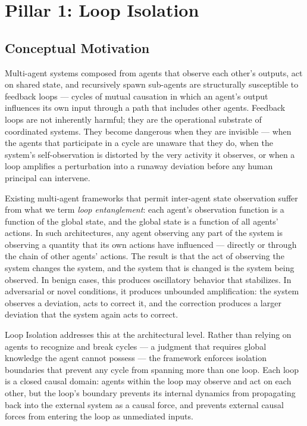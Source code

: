 \section{Pillar 1: Loop Isolation}\label{sec:pillar-loop-isolation}

\subsection{Conceptual Motivation}

Multi-agent systems composed from agents that observe each other's outputs, act on shared state, and recursively spawn sub-agents are structurally susceptible to feedback loops — cycles of mutual causation in which an agent's output influences its own input through a path that includes other agents. Feedback loops are not inherently harmful; they are the operational substrate of coordinated systems. They become dangerous when they are invisible — when the agents that participate in a cycle are unaware that they do, when the system's self-observation is distorted by the very activity it observes, or when a loop amplifies a perturbation into a runaway deviation before any human principal can intervene.

Existing multi-agent frameworks that permit inter-agent state observation suffer from what we term \textit{loop entanglement}: each agent's observation function is a function of the global state, and the global state is a function of all agents' actions. In such architectures, any agent observing any part of the system is observing a quantity that its own actions have influenced — directly or through the chain of other agents' actions. The result is that the act of observing the system changes the system, and the system that is changed is the system being observed. In benign cases, this produces oscillatory behavior that stabilizes. In adversarial or novel conditions, it produces unbounded amplification: the system observes a deviation, acts to correct it, and the correction produces a larger deviation that the system again acts to correct.

Loop Isolation addresses this at the architectural level. Rather than relying on agents to recognize and break cycles — a judgment that requires global knowledge the agent cannot possess — the \bxthree{} framework enforces isolation boundaries that prevent any cycle from spanning more than one loop. Each loop is a closed causal domain: agents within the loop may observe and act on each other, but the loop's boundary prevents its internal dynamics from propagating back into the external system as a causal force, and prevents external causal forces from entering the loop as unmediated inputs.

